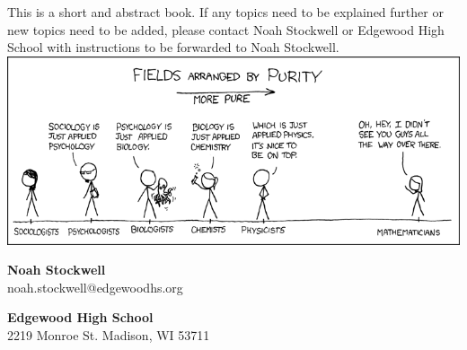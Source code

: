This is a short and abstract book. If any topics need to be explained further or new topics need to be added, please contact Noah Stockwell or Edgewood High School with instructions to be forwarded to Noah Stockwell.
\vfill
\includegraphics[width=\textwidth]{purity.png}
\vspace{.25in}
\par \textbf{Noah Stockwell}\\
noah.stockwell@edgewoodhs.org\\
\par \textbf{Edgewood High School}\\
2219 Monroe St. Madison, WI 53711